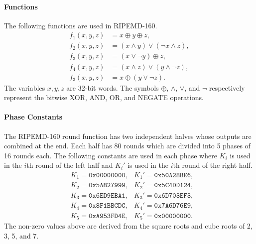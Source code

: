 \documentclass[10pt]{article}
\begin{document}
\paragraph{Functions}
The following functions are used in RIPEMD-160.
\begin{align*}
  f_1(x,y,z) & = x \oplus y \oplus z, \\
  f_2(x,y,z) & = \left( x \wedge y \right) \vee \left( \lnot x \wedge z \right), \\
  f_3(x,y,z) & = \left( x \vee \lnot y \right) \oplus z, \\
  f_4(x,y,z) & = \left( x \wedge z \right) \vee \left(  y \wedge \lnot z \right), \\
  f_3(x,y,z) & = x \oplus \left( y \vee \lnot z \right) .
\end{align*}
The variables $x, y, z$ are 32-bit words. The symbols $\oplus$, $\wedge$, $\vee$, and $\lnot$ respectively represent the bitwise XOR, AND, OR, and NEGATE operations.

\paragraph{Phase Constants}
The RIPEMD-160 round function has two independent halves whose outputs are combined at the end. Each half has 80 rounds which are divided into 5 phases of 16 rounds each. The following constants are used in each phase where $K_i$ is used in the $i$th round of the left half and $K_i'$ is used in the $i$th round of the right half.
\begin{align*}
  & K_1 = \texttt{0x00000000}, & K_1' = \texttt{0x50A28BE6},\\
  & K_2 = \texttt{0x5A827999}, & K_2' = \texttt{0x5C4DD124},\\
  & K_3 = \texttt{0x6ED9EBA1}, & K_3' = \texttt{0x6D703EF3},\\
  & K_4 = \texttt{0x8F1BBCDC}, & K_4' = \texttt{0x7A6D76E9},\\
  & K_5 = \texttt{0xA953FD4E}, & K_5' = \texttt{0x00000000}.
\end{align*}
The non-zero values above are derived from the square roots and cube roots of 2, 3, 5, and 7.
\end{document}
